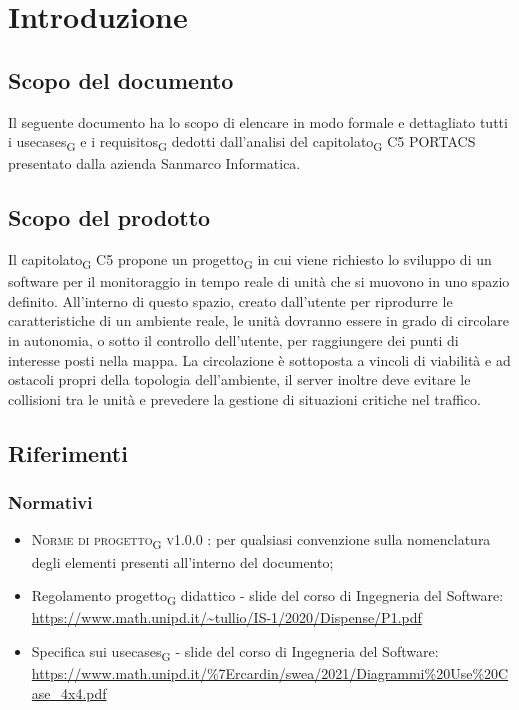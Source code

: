 \section{Introduzione}
\subsection{Scopo del documento}
Il seguente documento ha lo scopo di elencare in modo formale e dettagliato tutti i \glspl{usecase}\textsubscript{G} e i \glspl{requisito}\textsubscript{G} dedotti dall'analisi del \gls{capitolato}\textsubscript{G} C5 PORTACS presentato dalla azienda Sanmarco Informatica.

\subsection{Scopo del prodotto}
Il \gls{capitolato}\textsubscript{G} C5 propone un \gls{progetto}\textsubscript{G} in cui viene richiesto lo sviluppo di un software per il monitoraggio in tempo reale di unità che si muovono in uno spazio definito. All'interno di questo spazio, creato dall'utente per riprodurre le caratteristiche di un ambiente reale, le unità dovranno essere in grado di circolare in autonomia, o sotto il controllo dell'utente, per raggiungere dei punti di interesse posti nella mappa. La circolazione è sottoposta a vincoli di viabilità e ad ostacoli propri della topologia dell'ambiente, il server inoltre deve evitare le collisioni tra le unità e prevedere la gestione di situazioni critiche nel traffico.

\subsection{Riferimenti}
\subsubsection{Normativi}
\begin{itemize}
\item \textsc{Norme di \gls{progetto}\textsubscript{G} v1.0.0 }: per qualsiasi convenzione sulla nomenclatura degli elementi presenti all'interno del documento;
\item Regolamento \gls{progetto}\textsubscript{G} didattico - slide del corso di Ingegneria del Software: \\ \url{https://www.math.unipd.it/~tullio/IS-1/2020/Dispense/P1.pdf}
\item Specifica sui \glspl{usecase}\textsubscript{G} - slide del corso di Ingegneria del Software: \\ \url{https://www.math.unipd.it/\%7Ercardin/swea/2021/Diagrammi\%20Use\%20Case_4x4.pdf}
\end{itemize}
